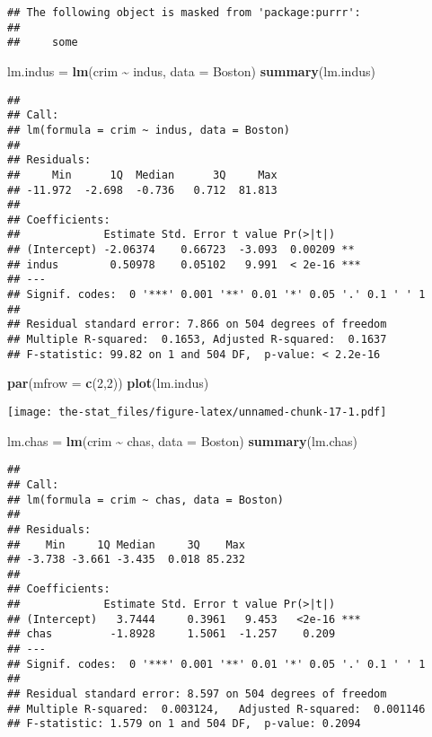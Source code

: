 \documentclass[
]{article}
\newenvironment{Shaded}{\begin{snugshade}}{\end{snugshade}}
\newcommand{\AttributeTok}[1]{\textcolor[rgb]{0.13,0.29,0.53}{#1}}
\newcommand{\DecValTok}[1]{\textcolor[rgb]{0.00,0.00,0.81}{#1}}
\newcommand{\FunctionTok}[1]{\textcolor[rgb]{0.13,0.29,0.53}{\textbf{#1}}}
\newcommand{\NormalTok}[1]{#1}
\newcommand{\OtherTok}[1]{\textcolor[rgb]{0.56,0.35,0.01}{#1}}
\newcommand{\SpecialCharTok}[1]{\textcolor[rgb]{0.81,0.36,0.00}{\textbf{#1}}}
\begin{document}
\begin{verbatim}
## The following object is masked from 'package:purrr':
## 
##     some
\end{verbatim}

\begin{Shaded}
\begin{Highlighting}[]
\NormalTok{lm.indus }\OtherTok{=} \FunctionTok{lm}\NormalTok{(crim }\SpecialCharTok{\textasciitilde{}}\NormalTok{ indus, }\AttributeTok{data =}\NormalTok{ Boston)}
\FunctionTok{summary}\NormalTok{(lm.indus)}
\end{Highlighting}
\end{Shaded}

\begin{verbatim}
## 
## Call:
## lm(formula = crim ~ indus, data = Boston)
## 
## Residuals:
##     Min      1Q  Median      3Q     Max 
## -11.972  -2.698  -0.736   0.712  81.813 
## 
## Coefficients:
##             Estimate Std. Error t value Pr(>|t|)    
## (Intercept) -2.06374    0.66723  -3.093  0.00209 ** 
## indus        0.50978    0.05102   9.991  < 2e-16 ***
## ---
## Signif. codes:  0 '***' 0.001 '**' 0.01 '*' 0.05 '.' 0.1 ' ' 1
## 
## Residual standard error: 7.866 on 504 degrees of freedom
## Multiple R-squared:  0.1653, Adjusted R-squared:  0.1637 
## F-statistic: 99.82 on 1 and 504 DF,  p-value: < 2.2e-16
\end{verbatim}

\begin{Shaded}
\begin{Highlighting}[]
\FunctionTok{par}\NormalTok{(}\AttributeTok{mfrow =} \FunctionTok{c}\NormalTok{(}\DecValTok{2}\NormalTok{,}\DecValTok{2}\NormalTok{))}
\FunctionTok{plot}\NormalTok{(lm.indus)}
\end{Highlighting}
\end{Shaded}

\texttt{[image: the-stat\_files/figure-latex/unnamed-chunk-17-1.pdf]}

\begin{Shaded}
\begin{Highlighting}[]
\NormalTok{lm.chas }\OtherTok{=} \FunctionTok{lm}\NormalTok{(crim }\SpecialCharTok{\textasciitilde{}}\NormalTok{ chas, }\AttributeTok{data =}\NormalTok{ Boston)}
\FunctionTok{summary}\NormalTok{(lm.chas)}
\end{Highlighting}
\end{Shaded}

\begin{verbatim}
## 
## Call:
## lm(formula = crim ~ chas, data = Boston)
## 
## Residuals:
##    Min     1Q Median     3Q    Max 
## -3.738 -3.661 -3.435  0.018 85.232 
## 
## Coefficients:
##             Estimate Std. Error t value Pr(>|t|)    
## (Intercept)   3.7444     0.3961   9.453   <2e-16 ***
## chas         -1.8928     1.5061  -1.257    0.209    
## ---
## Signif. codes:  0 '***' 0.001 '**' 0.01 '*' 0.05 '.' 0.1 ' ' 1
## 
## Residual standard error: 8.597 on 504 degrees of freedom
## Multiple R-squared:  0.003124,   Adjusted R-squared:  0.001146 
## F-statistic: 1.579 on 1 and 504 DF,  p-value: 0.2094
\end{verbatim}
\end{document}
